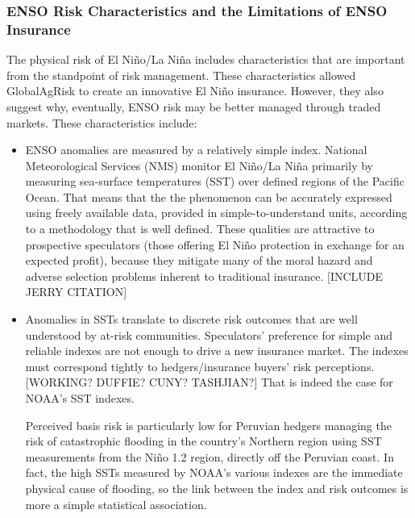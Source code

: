 \documentclass[authoryear]{article}
\begin{document}
\subsubsection{ENSO Risk Characteristics and the Limitations of ENSO Insurance}
The physical risk of El Ni\~no/La Ni\~na includes characteristics that are important from the standpoint of risk management. These characteristics allowed GlobalAgRisk to create an innovative El Ni\~no insurance. However, they also suggest why, eventually, ENSO risk may be better managed through traded markets. These characteristics include:
\begin{itemize}
\item ENSO anomalies are measured by a relatively simple index.
National Meteorological Services (NMS) monitor El Ni\~no/La Ni\~na primarily by measuring sea-surface temperatures (SST) over defined regions of the Pacific Ocean. That means that the the phenomenon can be accurately expressed using freely available data, provided in simple-to-understand units, according to a methodology that is well defined. These qualities are attractive to prospective speculators (those offering El Ni\~no protection in exchange for an expected profit), because they mitigate many of the moral hazard and adverse selection problems inherent to traditional insurance. [INCLUDE JERRY CITATION] 
\item Anomalies in SSTs translate to discrete risk outcomes that are well understood by at-risk communities.
Speculators' preference for simple and reliable indexes are not enough to drive a new insurance market. The indexes must correspond tightly to hedgers/insurance buyers' risk perceptions.[WORKING? DUFFIE? CUNY? TASHJIAN?] That is indeed the case for NOAA's SST indexes. 

Perceived basis risk is particularly low for Peruvian hedgers managing the risk of catastrophic flooding in the country's Northern region using SST measurements from the Ni\~no 1.2 region, directly off the Peruvian coast. In fact, the high SSTs measured by NOAA's various indexes are the immediate physical cause of flooding, so the link between the index and risk outcomes is more a simple statistical association\cite{khalil2007nino}. 


\end{itemize}
\end{document}

